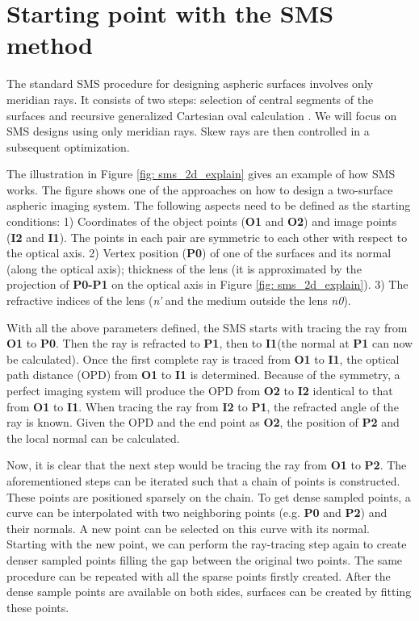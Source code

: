 \section{Starting point with the SMS method}
The standard SMS procedure for designing aspheric surfaces involves only meridian rays. It consists of two steps: selection of central segments of the surfaces and recursive generalized Cartesian oval calculation \cite{LinWang2011}\cite{MinanoOE09}. We will focus on SMS designs using only meridian rays. Skew rays are then controlled in a subsequent optimization. 

The illustration in Figure \ref{fig: sms_2d_explain} gives an example of how SMS works. The figure shows one of the approaches on how to design a two-surface aspheric imaging system. The following aspects need to be defined as the starting conditions: 1) Coordinates of the object points (\textbf{O1} and \textbf{O2}) and image points (\textbf{I2} and \textbf{I1}). The points in each pair are symmetric to each other with respect to the optical axis. 2) Vertex position (\textbf{P0}) of one of the surfaces and its normal (along the optical axis); thickness of the lens (it is approximated by the projection of \textbf{P0-P1} on the optical axis in Figure \ref{fig: sms_2d_explain}). 3) The refractive indices of the lens (\textit{n'} and the medium outside the lens \textit{n0}). 

With all the above parameters defined, the SMS starts with tracing the ray from \textbf{O1} to \textbf{P0}. Then the ray is refracted to \textbf{P1}, then to \textbf{I1}(the normal at \textbf{P1} can now be calculated). Once the first complete ray is traced from \textbf{O1} to \textbf{I1}, the optical path distance (OPD) from \textbf{O1} to \textbf{I1} is determined. Because of the symmetry, a perfect imaging system will produce the OPD from \textbf{O2} to \textbf{I2} identical to that from \textbf{O1} to \textbf{I1}. When tracing the ray from \textbf{I2} to \textbf{P1}, the refracted angle of the ray is known. Given the OPD and the end point as \textbf{O2}, the position of \textbf{P2} and the local normal can be calculated. 

Now, it is clear that the next step would be tracing the ray from \textbf{O1} to \textbf{P2}. The aforementioned steps can be iterated such that a chain of points is constructed. These points are positioned sparsely on the chain. To get dense sampled points, a curve can be interpolated with two neighboring points (e.g.  \textbf{P0} and \textbf{P2}) and their normals. A new point can be selected on this curve with its normal. Starting with the new point, we can perform the ray-tracing step again to create denser sampled points filling the gap between the original two points. The same procedure can be repeated with all the sparse points firstly created. After the dense sample points are available on both sides, surfaces can be created by fitting these points. 

